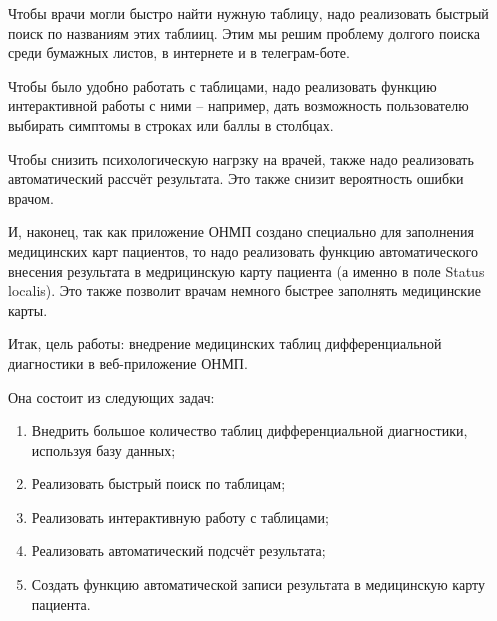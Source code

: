Чтобы врачи могли быстро найти нужную таблицу, надо реализовать быстрый поиск по названиям этих таблииц. Этим мы решим проблему долгого поиска среди бумажных листов, в интернете и в телеграм-боте.

Чтобы было удобно работать с таблицами, надо реализовать функцию интерактивной работы с ними -- например, дать возможность пользователю выбирать симптомы в строках или баллы в столбцах.

Чтобы снизить психологическую нагрзку на врачей, также надо реализовать автоматический рассчёт результата. Это также снизит вероятность ошибки врачом.

И, наконец, так как приложение ОНМП создано специально для заполнения медицинских карт пациентов, то надо реализовать функцию автоматического внесения результата в медрицинскую карту пациента (а именно в поле Status localis). Это также позволит врачам немного быстрее заполнять медицинские карты.

Итак, цель работы: внедрение медицинских таблиц дифференциальной диагностики в веб-приложение ОНМП.

Она состоит из следующих задач:

\begin{enumerate}
  \item Внедрить большое количество таблиц дифференциальной диагностики, используя базу данных;
  \item Реализовать быстрый поиск по таблицам;
  \item Реализовать интерактивную работу с таблицами;
  \item Реализовать автоматический подсчёт результата;
  \item Создать функцию автоматической записи результата в медицинскую карту пациента.
\end{enumerate}



